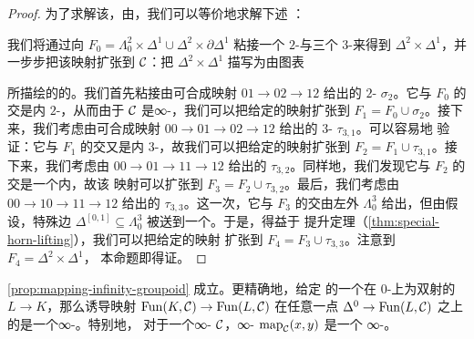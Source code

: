 \begin{proof}
为了求解该\trLiftingProblem{}，由\trAdjunction{}，我们可以等价地求解下述%
\trLiftingProblem{}：
\begin{center}
\end{center}
我们将通过向
$F_0 = \Lambda^2_0 \times \Delta^1 \cup \Delta^2 \times \partial \Delta^1$
粘接一个 $2$-\trSimplex{}与三个 $3$-\trSimplex{}来得到
$\Delta^2 \times \Delta^1$，并一步步把该映射扩张到 $\mathcal{C}$：把
$\Delta^2 \times \Delta^1$ 描写为由图表
\begin{center}
\end{center}
所描绘的\trCategory{}的\trNerve{}。我们首先粘接由可合成映射
$01 \to 02 \to 12$ 给出的 $2$-\trSimplex{} $\sigma_2$。它与 $F_0$ 的交是内
$2$-\trHorn{}，从而由于 $\mathcal{C}$ 是∞-\trCategory{}，我们可以把给定的映射扩张到
$F_1 = F_0 \cup \sigma_2$。接下来，我们考虑由可合成映射
$00 \to 01 \to 02 \to 12$ 给出的 $3$-\trSimplex{} $\tau_{3,1}$。可以容易地
验证：它与 $F_1$ 的交又是内 $3$-\trHorn{}，故我们可以把给定的映射扩张到
$F_2 = F_1 \cup \tau_{3,1}$。接下来，我们考虑由 $00 \to 01 \to 11 \to 12$
给出的 $\tau_{3,2}$。同样地，我们发现它与 $F_2$ 的交是一个内\trHorn{}，故该
映射可以扩张到 $F_3 = F_2 \cup \tau_{3,2}$。最后，我们考虑由
$00 \to 10 \to 11 \to 12$ 给出的 $\tau_{3,3}$。这一次，它与 $F_3$ 的交由左外\trHorn{}%
$\Lambda^3_0$ 给出，但由假设，特殊边
$\Delta^{[0,1]} \subseteq \Lambda^3_0$ 被送到一个\trEquivalence{}。于是，得益于%
\trJoyal{}提升定理（\cref{thm:special-horn-lifting}），我们可以把给定的映射
扩张到 $F_4 = F_3 \cup \tau_{3,3}$。注意到 $F_4 = \Delta^2 \times \Delta^1$，
本命题即得证。
\end{proof}

\begin{corollary}\label{cor:mapping-infinity-groupoid}
\cref{prop:mapping-infinity-groupoid} 成立。更精确地，给定\trSimplicialSets{}%
的一个在 $0$-\trSimplex{}上为双射的\trMonomorphism{} $L \to K$，那么诱导映射
$\mathrm{Fun}(K, \mathcal{C}) \to \mathrm{Fun}(L, \mathcal{C})$ 在任意一点
$\Delta^0 \to \mathrm{Fun}(L, \mathcal{C})$ 之上的\trFibre{}是一个∞-\trGroupoid{}。特别地，
对于一个∞-\trCategory{} $\mathcal{C}$，∞-\trCategory{} $\mathrm{map}_{\mathcal{C}}(x, y)$ 是一个
∞-\trGroupoid{}。
\end{corollary}

